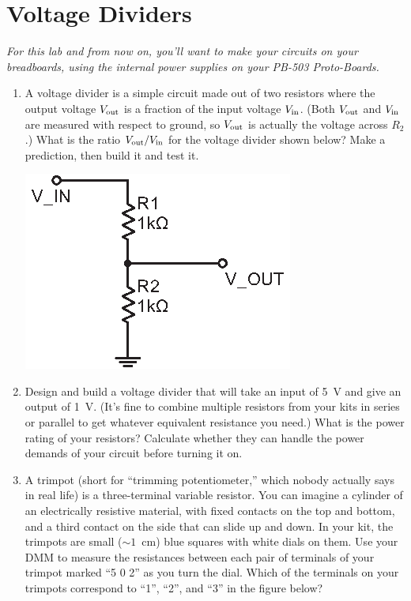 \section{Voltage Dividers}
\label{lab_voltage_dividers}


\bigskip

\textit{For this lab and from now on, you'll want to make your circuits on your breadboards, using the internal power supplies on your PB-503 Proto-Boards.}

\begin{enumerate}[wide]

\item A voltage divider is a simple circuit made out of two resistors where the output voltage $V_{\rm out}$ is a fraction of the input voltage $V_{\rm in}$.  (Both $V_{\rm out}$ and $V_{\rm in}$ are measured with respect to ground, so $V_{\rm out}$ is actually the voltage across $R_2$.)  What is the ratio $V_{\rm out}/V_{\rm in}$ for the voltage divider shown below?  Make a prediction, then build it and test it.
 
\begin{center}
\includegraphics{voltage_dividers/voltage_divider.eps}
\end{center}

\item Design and build a voltage divider that will take an input of 5~V and give an output of 1~V.  (It's fine to combine multiple resistors from your kits in series or parallel to get whatever equivalent resistance you need.)  What is the power rating of your resistors?  Calculate whether they can handle the power demands of your circuit before turning it on. \label{part_five_to_one}

\item A trimpot (short for ``trimming potentiometer,'' which nobody actually says in real life) is a three-terminal variable resistor.  You can imagine a cylinder of an electrically resistive material, with fixed contacts on the top and bottom, and a third contact on the side that can slide up and down.  In your kit, the trimpots are small ($\sim 1$~cm) blue squares with white dials on them.  Use your DMM to measure the resistances between each pair of terminals of your trimpot marked ``5 0 2'' as you turn the dial.  Which of the terminals on your trimpots correspond to ``1'', ``2'', and ``3'' in the figure below?   


\end{enumerate}
